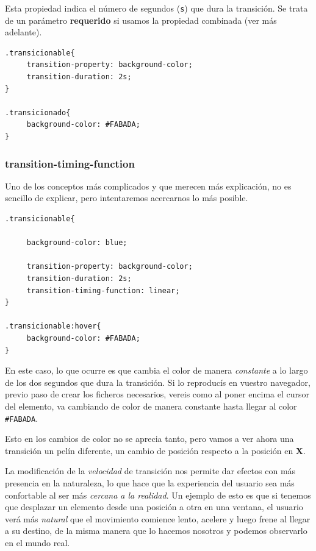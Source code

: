 \documentclass[11pt]{article}
\begin{document}
Esta propiedad indica el número de segundos (\verb~s~) que dura la transición. Se
trata de un parámetro \textbf{requerido} si usamos la propiedad combinada (ver más
adelante).

\begin{verbatim}
.transicionable{
     transition-property: background-color;
     transition-duration: 2s;
}

.transicionado{
     background-color: #FABADA;
}
\end{verbatim}

\subsubsection{transition-timing-function}
\label{sec-1-2-3}


Uno de los conceptos más complicados y que merecen más explicación, no es
sencillo de explicar, pero intentaremos acercarnos lo más posible.

\begin{verbatim}
.transicionable{

     background-color: blue;

     transition-property: background-color;
     transition-duration: 2s;
     transition-timing-function: linear; 
}

.transicionable:hover{
     background-color: #FABADA;
}
\end{verbatim}

En este caso, lo que ocurre es que cambia el color de manera \emph{constante} a lo
largo de los dos segundos que dura la transición. Si lo reproducís en vuestro
navegador, previo paso de crear los ficheros necesarios, vereis como al poner
encima el cursor del elemento, va cambiando de color de manera constante hasta
llegar al color \verb~#FABADA~.

Esto en los cambios de color no se aprecia tanto, pero vamos a ver ahora una
transición un pelín diferente, un cambio de posición respecto a la posición en
\textbf{X}. 

La modificación de la \emph{velocidad} de transición nos permite dar efectos con más
presencia en la naturaleza, lo que hace que la experiencia del usuario sea más
confortable al ser más \emph{cercana a la realidad}. Un ejemplo de esto es que si
tenemos que desplazar un elemento desde una posición a otra en una ventana, el
usuario verá más \emph{natural} que el movimiento comience lento, acelere y luego
frene al llegar a su destino, de la misma manera que lo hacemos nosotros y
podemos observarlo en el mundo real.
\end{document}
